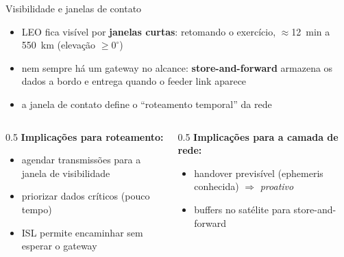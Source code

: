 \documentclass[aspectratio=169,11pt]{beamer}
\begin{document}
\begin{frame}{Visibilidade e janelas de contato}
  \begin{itemize}
    \item LEO fica visível por \textbf{janelas curtas}: retomando o exercício, $\approx$12~min a 550~km (elevação $\geq 0^\circ$)
    \item nem sempre há um gateway no alcance: \textbf{store-and-forward} armazena os dados a bordo e entrega quando o feeder link aparece
    \item a janela de contato define o ``roteamento temporal'' da rede
  \end{itemize}
  \begin{columns}
    \begin{column}{0.5\textwidth}
      \textbf{Implicações para roteamento:}
      \begin{itemize}
        \item agendar transmissões para a janela de visibilidade
        \item priorizar dados críticos (pouco tempo)
        \item ISL permite encaminhar sem esperar o gateway
      \end{itemize}
    \end{column}
    \begin{column}{0.5\textwidth}
      \textbf{Implicações para a camada de rede:}
      \begin{itemize}
        \item handover previsível (ephemeris conhecida) $\Rightarrow$ \emph{proativo}
        \item buffers no satélite para store-and-forward
      \end{itemize}
    \end{column}
  \end{columns}
\end{frame}
\end{document}
